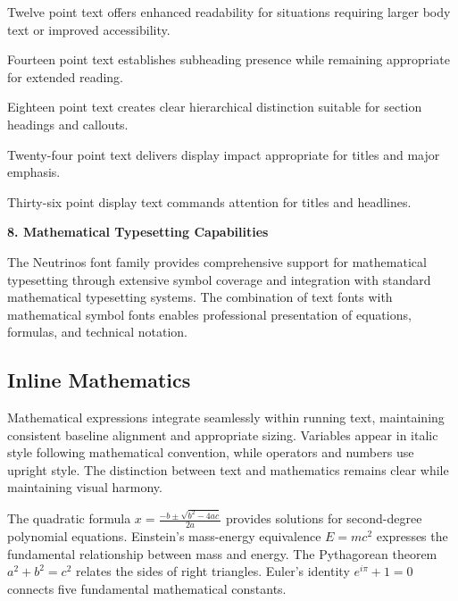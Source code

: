 \documentclass[11pt,letterpaper]{article}
\newcommand{\sectionheader}[1]{%
\vspace{1em}
\noindent
\colorbox{neutrinosblue}{%
\begin{minipage}{\textwidth}
\vspace{0.3em}
{\color{white}\LARGE\textbf{#1}}
\vspace{0.3em}
\end{minipage}}
\vspace{0.5em}
}
\begin{document}
{\fontsize{12}{14}\selectfont Twelve point text offers enhanced readability for situations requiring larger body text or improved accessibility.}

{\fontsize{14}{17}\selectfont Fourteen point text establishes subheading presence while remaining appropriate for extended reading.}

{\fontsize{18}{22}\selectfont Eighteen point text creates clear hierarchical distinction suitable for section headings and callouts.}

{\fontsize{24}{29}\selectfont Twenty-four point text delivers display impact appropriate for titles and major emphasis.}

{\fontsize{36}{43}\selectfont Thirty-six point display text commands attention for titles and headlines.}

\newpage

\sectionheader{8. Mathematical Typesetting Capabilities}

The Neutrinos font family provides comprehensive support for mathematical typesetting through extensive symbol coverage and integration with standard mathematical typesetting systems. The combination of text fonts with mathematical symbol fonts enables professional presentation of equations, formulas, and technical notation.

\subsection{Inline Mathematics}

Mathematical expressions integrate seamlessly within running text, maintaining consistent baseline alignment and appropriate sizing. Variables appear in italic style following mathematical convention, while operators and numbers use upright style. The distinction between text and mathematics remains clear while maintaining visual harmony.

The quadratic formula $x = \frac{-b \pm \sqrt{b^2 - 4ac}}{2a}$ provides solutions for second-degree polynomial equations. Einstein's mass-energy equivalence $E = mc^2$ expresses the fundamental relationship between mass and energy. The Pythagorean theorem $a^2 + b^2 = c^2$ relates the sides of right triangles. Euler's identity $e^{i\pi} + 1 = 0$ connects five fundamental mathematical constants.
\end{document}
